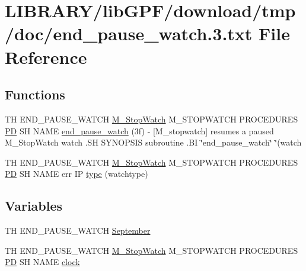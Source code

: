\hypertarget{end__pause__watch_83_8txt}{}\section{L\+I\+B\+R\+A\+R\+Y/lib\+G\+P\+F/download/tmp/doc/end\+\_\+pause\+\_\+watch.3.txt File Reference}
\label{end__pause__watch_83_8txt}
\subsection*{Functions}
\begin{DoxyCompactItemize}
\item 
TH E\+N\+D\+\_\+\+P\+A\+U\+S\+E\+\_\+\+W\+A\+T\+CH \hyperlink{option__stopwatch_83_8txt_aa2011fc45a5e502e87ee50996a8a9305}{M\+\_\+\+Stop\+Watch} M\+\_\+\+S\+T\+O\+P\+W\+A\+T\+CH P\+R\+O\+C\+E\+D\+U\+R\+ES \hyperlink{what__overview_81_8txt_a85f26da5a4481fbdb0d9c79f2b94de3e}{PD} SH N\+A\+ME \hyperlink{end__pause__watch_83_8txt_aab2e2d273c44ad682568533e5099a62f}{end\+\_\+pause\+\_\+watch} (3f) -\/ \mbox{[}\+M\+\_\+stopwatch\mbox{]} resumes a paused M\+\_\+\+Stop\+Watch watch .\+S\+H S\+Y\+N\+O\+P\+S\+I\+S subroutine .\+B\+I \char`\"{}end\+\_\+pause\+\_\+watch\char`\"{} \char`\"{}(watch
\item 
TH E\+N\+D\+\_\+\+P\+A\+U\+S\+E\+\_\+\+W\+A\+T\+CH \hyperlink{option__stopwatch_83_8txt_aa2011fc45a5e502e87ee50996a8a9305}{M\+\_\+\+Stop\+Watch} M\+\_\+\+S\+T\+O\+P\+W\+A\+T\+CH P\+R\+O\+C\+E\+D\+U\+R\+ES \hyperlink{what__overview_81_8txt_a85f26da5a4481fbdb0d9c79f2b94de3e}{PD} SH N\+A\+ME err IP \hyperlink{end__pause__watch_83_8txt_a4519ce363764fb1188bbf48b67a49759}{type} (watchtype)
\end{DoxyCompactItemize}
\subsection*{Variables}
\begin{DoxyCompactItemize}
\item 
TH E\+N\+D\+\_\+\+P\+A\+U\+S\+E\+\_\+\+W\+A\+T\+CH \hyperlink{end__pause__watch_83_8txt_abe419b6cfb3e18ea312428eb58b25a14}{September}
\item 
TH E\+N\+D\+\_\+\+P\+A\+U\+S\+E\+\_\+\+W\+A\+T\+CH \hyperlink{option__stopwatch_83_8txt_aa2011fc45a5e502e87ee50996a8a9305}{M\+\_\+\+Stop\+Watch} M\+\_\+\+S\+T\+O\+P\+W\+A\+T\+CH P\+R\+O\+C\+E\+D\+U\+R\+ES \hyperlink{what__overview_81_8txt_a85f26da5a4481fbdb0d9c79f2b94de3e}{PD} SH N\+A\+ME \hyperlink{end__pause__watch_83_8txt_a872617f37ec8987521e3b8eb64ee451b}{clock}
\end{DoxyCompactItemize}


